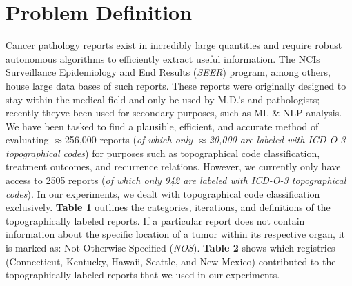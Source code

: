 \documentclass[twoside,twocolumn]{article}
\begin{document}
\section{Problem Definition}
Cancer pathology reports exist in incredibly large quantities and require robust autonomous algorithms to efficiently extract useful information. The NCI\textquotesingle s Surveillance Epidemiology and End Results (\textit{SEER}) program, among others, house large data bases of such reports. These reports were originally designed to stay within the medical field and only be used by M.D.'s and pathologists; recently they\textquotesingle ve been used for secondary purposes, such as ML \& NLP analysis. We have been tasked to find a plausible, efficient, and accurate method of evaluating $\approx$256,000 reports (\textit{of which only $\approx$20,000 are labeled with ICD-O-3 topographical codes}) for purposes such as topographical code classification, treatment outcomes, and recurrence relations. However, we currently only have access to 2505 reports (\textit{of which only 942 are labeled with ICD-O-3 topographical codes}). In our experiments, we dealt with topographical code classification exclusively. \textbf{Table 1} outlines the categories, iterations, and definitions of the topographically labeled reports. If a particular report does not contain information about the specific location of a tumor within its respective organ, it is marked as: Not Otherwise Specified (\textit{NOS}). \textbf{Table 2} shows which registries (Connecticut, Kentucky, Hawaii, Seattle, and New Mexico) contributed to the topographically labeled reports that we used in our experiments.

\begin{table}
\caption{ICD-O-3 Topographical Codes}
\centering
{}
\end{table}
\end{document}
